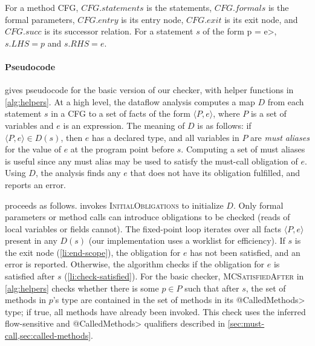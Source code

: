 For a method CFG, $\mathit{CFG.statements}$ is the statements,
$\mathit{CFG.formals}$ is the formal parameters,
$\mathit{CFG.entry}$ is its entry node,
$\mathit{CFG.exit}$ is its exit node, and
$\mathit{CFG.succ}$ is its successor relation.
For a statement
$s$ of the form \<p = e>, $s.LHS = p$ and $s.RHS = e$.

\paragraph{Pseudocode}  gives pseudocode for the
basic version of our checker, with helper functions in \cref{alg:helpers}.  At a
high level, the dataflow analysis computes a map $D$ from each statement $s$ in
a CFG to a set of facts of the form $\langle P, e \rangle$, where $P$ is
a set of variables and $e$ is an expression.  The meaning
of $D$ is as follows: if $\langle P, e \rangle
\in D(s)$, then $e$ has a declared \MustCall type, and all variables in $P$
are \emph{must aliases} for the value of $e$ at the program point before $s$.
Computing a set of must aliases is useful since any must alias may be used to
satisfy the must-call obligation of $e$.  Using $D$, the analysis finds any $e$
that does not have its \MustCall obligation fulfilled, and reports an error.

 proceeds as follows.  
invokes \textsc{InitialObligations} to initialize $D$.  Only formal parameters
or method calls can introduce obligations to be checked (reads of local
variables or fields cannot).
The fixed-point loop
iterates over all facts $\langle P, e \rangle$ present in any
$D(s)$ (our implementation uses a worklist for efficiency).  If $s$ is the exit
node (\cref{li:end-scope}), the obligation for $e$ has not been satisfied, and
an error is reported.  Otherwise, the algorithm checks if the obligation for $e$
is satisfied after $s$ (\cref{li:check-satisfied}).  For the basic checker,
\textsc{MCSatisfiedAfter} in \cref{alg:helpers} checks whether there is some $p
\in P$ such that after $s$, the set of methods in $p$'s \MustCall type are contained
in the set of methods in its
\<@CalledMethods> type; if true, all \MustCall methods have already been
invoked.  This check uses the inferred flow-sensitive \MustCall and
\<@CalledMethods> qualifiers described in
\cref{sec:must-call,sec:called-methods}.

